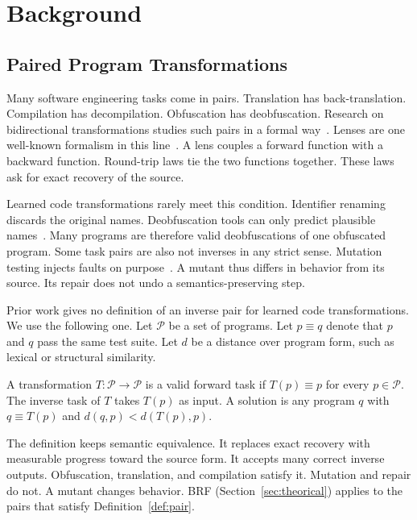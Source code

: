 \section{Background}
\label{sec:background}
 
\subsection{Paired Program Transformations}
\label{sec:bg-pairs}
 
Many software engineering tasks come in pairs.
Translation has back-translation.
Compilation has decompilation.
Obfuscation has deobfuscation.
Research on bidirectional transformations studies such pairs in a formal way~\cite{czarnecki2009bx}.
Lenses are one well-known formalism in this line~\cite{foster2007lenses}.
A lens couples a forward function with a backward function.
Round-trip laws tie the two functions together.
These laws ask for exact recovery of the source.
 
Learned code transformations rarely meet this condition.
Identifier renaming discards the original names.
Deobfuscation tools can only predict plausible names~\cite{raychev2015jsnice,bichsel2016deguard}.
Many programs are therefore valid deobfuscations of one obfuscated program.
Some task pairs are also not inverses in any strict sense.
Mutation testing injects faults on purpose~\cite{jia2011mutation}.
A mutant thus differs in behavior from its source.
Its repair does not undo a semantics-preserving step.
 
Prior work gives no definition of an inverse pair for learned code transformations.
We use the following one.
Let $\mathcal{P}$ be a set of programs.
Let $p \equiv q$ denote that $p$ and $q$ pass the same test suite.
Let $d$ be a distance over program form, such as lexical or structural similarity.
 
\begin{definition}
\label{def:pair}
A transformation $T:\mathcal{P}\rightarrow\mathcal{P}$ is a valid forward task if $T(p) \equiv p$ for every $p \in \mathcal{P}$.
The inverse task of $T$ takes $T(p)$ as input.
A solution is any program $q$ with $q \equiv T(p)$ and $d(q,p) < d(T(p),p)$.
\end{definition}
 
The definition keeps semantic equivalence.
It replaces exact recovery with measurable progress toward the source form.
It accepts many correct inverse outputs.
Obfuscation, translation, and compilation satisfy it.
Mutation and repair do not.
A mutant changes behavior.
BRF (Section~\ref{sec:theorical}) applies to the pairs that satisfy Definition~\ref{def:pair}.
 

